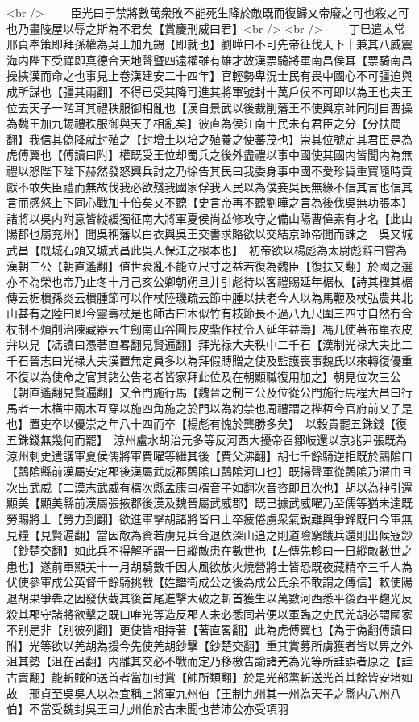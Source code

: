 <br />
　　臣光曰于禁將數萬衆敗不能死生降於敵既而復歸文帝廢之可也殺之可也乃畫陵屋以辱之斯為不君矣【賞慶刑威曰君】<br />
<br />
　　丁巳遣太常邢貞奉策即拜孫權為吳王加九錫【即就也】劉曄曰不可先帝征伐天下十兼其八威震海内陛下受禪即真德合天地聲暨四遠權雖有雄才故漢票騎將軍南昌侯耳【票騎南昌操挾漢而命之也事見上卷漢建安二十四年】官輕勢卑況士民有畏中國心不可彊迫與成所謀也【彊其兩翻】不得已受其降可進其將軍號封十萬戶侯不可即以為王也夫王位去天子一階耳其禮秩服御相亂也【漢自景武以後裁削藩王不使與京師同制自曹操為魏王加九錫禮秩服御與天子相亂矣】彼直為侯江南士民未有君臣之分【分扶問翻】我信其偽降就封殖之【封增土以培之殖養之使蕃茂也】崇其位號定其君臣是為虎傅翼也【傅讀曰附】權既受王位却蜀兵之後外盡禮以事中國使其國内皆聞内為無禮以怒陛下陛下赫然發怒興兵討之乃徐告其民曰我委身事中國不愛珍貨重寶隨時貢獻不敢失臣禮而無故伐我必欲殘我國家俘我人民以為僕妾吳民無緣不信其言也信其言而感怒上下同心戰加十倍矣又不聽【史言帝再不聽劉曄之言為後伐吳無功張本】諸將以吳内附意皆縱緩獨征南大將軍夏侯尚益修攻守之備山陽曹偉素有才名【此山陽郡也屬兖州】聞吳稱藩以白衣與吳王交書求賂欲以交結京師帝聞而誅之　吳又城武昌【既城石頭又城武昌此吳人保江之根本也】　初帝欲以楊彪為太尉彪辭曰嘗為漢朝三公【朝直遙翻】值世衰亂不能立尺寸之益若復為魏臣【復扶又翻】於國之選亦不為榮也帝乃止冬十月己亥公卿朝朔旦并引彪待以客禮賜延年椐杖【詩其檉其椐傳云椐樻孫炎云樻腫節可以作杖陸璣疏云節中腫以扶老今人以為馬鞭及杖弘農共北山甚有之陸曰即今靈壽杖是也師古曰木似竹有枝節長不過八九尺圍三四寸自然冇合杖制不煩削治陳藏器云生劒南山谷圓長皮紫作杖令人延年益壽】馮几使著布單衣皮弁以見【馮讀曰憑著直畧翻見賢遍翻】拜光禄大夫秩中二千石【漢制光禄大夫比二千石晉志曰光禄大夫漢置無定員多以為拜假賻贈之使及監護喪事魏氏以來轉復優重不復以為使命之官其諸公告老者皆家拜此位及在朝顯職復用加之】朝見位次三公【朝直遙翻見賢遍翻】又令門施行馬【魏晉之制三公及位從公門施行馬程大昌曰行馬者一木横中兩木互穿以施四角施之於門以為約禁也周禮謂之梐枑今官府前乂子是也】置吏卒以優崇之年八十四而卒【楊彪有愧於龔勝多矣】　以穀貴罷五銖錢【復五銖錢無幾何而罷】　涼州盧水胡治元多等反河西大擾帝召鄒岐還以京兆尹張既為涼州刺史遣護軍夏侯儒將軍費曜等繼其後【費父沸翻】胡七千餘騎逆拒既於鸇隂口【鸇隂縣前漢屬安定郡後漢屬武威郡鸇隂口鸇隂河口也】既揚聲軍從鸇隂乃潜由且次出武威【二漢志武威有楈次縣孟康曰楈音子如翻次音咨即且次也】胡以為神引還顯美【顯美縣前漢屬張掖郡後漢及魏晉屬武威郡】既已據武威曜乃至儒等猶未達既勞賜將士【勞力到翻】欲進軍擊胡諸將皆曰士卒疲倦虜衆氣銳難與爭鋒既曰今軍無見糧【見賢遍翻】當因敵為資若虜見兵合退依深山追之則道險窮餓兵還則出候寇鈔【鈔楚交翻】如此兵不得解所謂一日縱敵患在數世也【左傳先軫曰一日縱敵數世之患也】遂前軍顯美十一月胡騎數千因大風欲放火燒營將士皆恐既夜藏精卒三千人為伏使參軍成公英督千餘騎挑戰【姓譜衛成公之後為成公氏余不敢謂之傳信】敕使陽退胡果爭犇之因發伏截其後首尾進擊大破之斬首獲生以萬數河西悉平後西平麴光反殺其郡守諸將欲擊之既曰唯光等造反郡人未必悉同若便以軍臨之吏民羌胡必謂國家不别是非【别彼列翻】更使皆相持著【著直畧翻】此為虎傅翼也【為于偽翻傅讀曰附】光等欲以羌胡為援今先使羌胡鈔擊【鈔楚交翻】重其賞募所虜獲者皆以畀之外沮其勢【沮在呂翻】内離其交必不戰而定乃移檄告諭諸羌為光等所詿誤者原之【詿古賣翻】能斬賊帥送首者當加封賞【帥所類翻】於是光部黨斬送光首其餘皆安堵如故　邢貞至吳吳人以為宜稱上將軍九州伯【王制九州其一州為天子之縣内八州八伯】不當受魏封吳王曰九州伯於古未聞也昔沛公亦受項羽